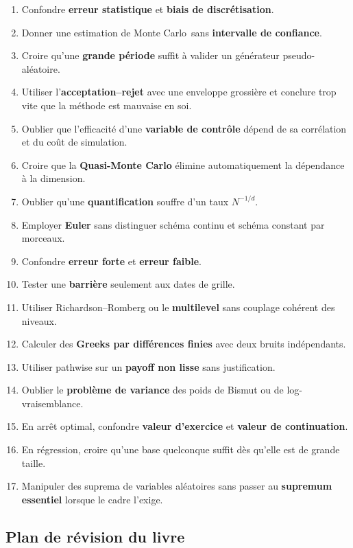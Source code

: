\documentclass[11pt,a4paper]{article}
\newcommand{\mc}{Monte Carlo}
\newcommand{\qmc}{Quasi-Monte Carlo}
\begin{document}
\begin{enumerate}
  \item Confondre \textbf{erreur statistique} et \textbf{biais de discrétisation}.
  \item Donner une estimation de \mc\ sans \textbf{intervalle de confiance}.
  \item Croire qu'une \textbf{grande période} suffit à valider un générateur pseudo-aléatoire.
  \item Utiliser l'\textbf{acceptation--rejet} avec une enveloppe grossière et conclure trop vite que la méthode est mauvaise en soi.
  \item Oublier que l'efficacité d'une \textbf{variable de contrôle} dépend de sa corrélation et du coût de simulation.
  \item Croire que la \textbf{\qmc} élimine automatiquement la dépendance à la dimension.
  \item Oublier qu'une \textbf{quantification} souffre d'un taux $N^{-1/d}$.
  \item Employer \textbf{Euler} sans distinguer schéma continu et schéma constant par morceaux.
  \item Confondre \textbf{erreur forte} et \textbf{erreur faible}.
  \item Tester une \textbf{barrière} seulement aux dates de grille.
  \item Utiliser Richardson--Romberg ou le \textbf{multilevel} sans couplage cohérent des niveaux.
  \item Calculer des \textbf{Greeks par différences finies} avec deux bruits indépendants.
  \item Utiliser pathwise sur un \textbf{payoff non lisse} sans justification.
  \item Oublier le \textbf{problème de variance} des poids de Bismut ou de log-vraisemblance.
  \item En arrêt optimal, confondre \textbf{valeur d'exercice} et \textbf{valeur de continuation}.
  \item En régression, croire qu'une base quelconque suffit dès qu'elle est de grande taille.
  \item Manipuler des suprema de variables aléatoires sans passer au \textbf{supremum essentiel} lorsque le cadre l'exige.
\end{enumerate}

\subsection{Plan de révision du livre}
\end{document}
